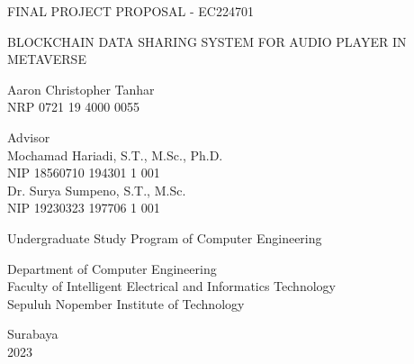\begin{large}
  FINAL PROJECT PROPOSAL - EC224701
\end{large}

\vspace{\fill}

\begin{spacing}{1.5}
  \begin{Large}
    BLOCKCHAIN DATA SHARING SYSTEM FOR AUDIO PLAYER IN METAVERSE
  \end{Large}
\end{spacing}

\vspace{\fill}

\begin{large}
  Aaron Christopher Tanhar \\
  \textmd{NRP 0721 19 4000 0055}
\end{large}

\vspace{\fill}

\begin{large}
  \textmd{Advisor} \\
  Mochamad Hariadi, S.T., M.Sc., Ph.D. \\
  \textmd{NIP 18560710 194301 1 001} \\
  Dr. Surya Sumpeno, S.T., M.Sc. \\
  \textmd{NIP 19230323 197706 1 001}
\end{large}

\vspace{\fill}

Undergraduate Study Program of Computer Engineering \\

\mdseries

Department of Computer Engineering \\
Faculty of Intelligent Electrical and Informatics Technology \\
Sepuluh Nopember Institute of Technology

Surabaya \\
2023

